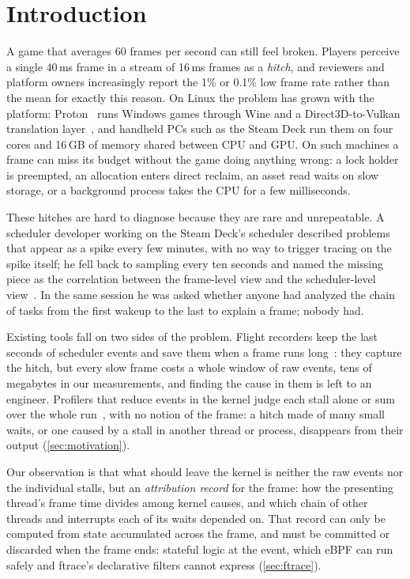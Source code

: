 \section{Introduction}

A game that averages 60 frames per second can still feel broken. Players
perceive a single 40\,ms frame in a stream of 16\,ms frames as a
\emph{hitch}, and reviewers and platform owners increasingly report the
1\% or 0.1\% low frame rate rather than the mean for exactly this reason.
On Linux the problem has grown with the platform: Proton~\cite{proton}
runs Windows games through Wine and a Direct3D-to-Vulkan translation
layer~\cite{dxvk,vkd3d-proton}, and handheld PCs such as the Steam Deck
run them on four cores and 16\,GB of memory shared between CPU and GPU. On
such machines a frame can miss its budget without the game doing anything
wrong: a lock holder is preempted, an allocation enters direct reclaim, an
asset read waits on slow storage, or a background process takes the CPU for
a few milliseconds.

These hitches are hard to diagnose because they are rare and unrepeatable.
A scheduler developer working on the Steam Deck's scheduler described
problems that appear as a spike every few minutes, with no way to trigger
tracing on the spike itself; he fell back to sampling every ten seconds and
named the missing piece as the correlation between the frame-level view and
the scheduler-level view~\cite{lwn-lpc2025-gaming,lpc2025-min}. In the same
session he was asked whether anyone had analyzed the chain of tasks from
the first wakeup to the last to explain a frame; nobody had.

Existing tools fall on two sides of the problem. Flight recorders keep the
last seconds of scheduler events and save them when a frame runs
long~\cite{ftracehist,perfetto-triggers}: they capture the hitch, but
every slow frame costs a whole window of raw events, tens of megabytes in
our measurements, and finding the cause in them is left to an engineer.
Profilers that reduce events in the kernel judge each stall alone or sum
over the whole run~\cite{perf-offcpu-thresh,gregg2019bpf,delayacct}, with no
notion of the frame: a hitch made of many small waits, or one caused by a
stall in another thread or process, disappears from their output
(\autoref{sec:motivation}).

Our observation is that what should leave the kernel is neither the raw
events nor the individual stalls, but an \emph{attribution record} for the
frame: how the presenting thread's frame time divides among kernel causes,
and which chain of other threads and interrupts each of its waits depended
on. That record can only be computed from state accumulated across the
frame, and must be committed or discarded when the frame ends: stateful
logic at the event, which eBPF can run safely and ftrace's declarative
filters cannot express (\autoref{sec:ftrace}).

